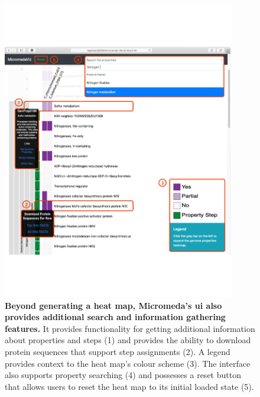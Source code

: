 \begin{figure}[!ht]
  \centering
	\includegraphics[width=0.9\textwidth]{media/micromeda-interface.pdf}
	 \caption[Beyond generating a heat map, Micromeda's UI also provides additional search and information gathering features.]{\textbf{Beyond generating a heat map, Micromeda's \gls{ui} also provides additional search and information gathering features.} It provides functionality for getting additional information about properties and steps (1) and provides the ability to download protein sequences that support step assignments (2). A legend provides context to the heat map's colour scheme (3). The interface also supports property searching (4) and possesses a reset button that allows users to reset the heat map to its initial loaded state (5).}
	 \label{fig:micromeda-interface}
\end{figure}

